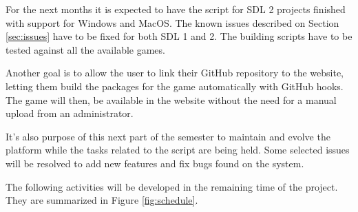 For the next months it is expected to have the script for SDL 2 projects finished with support for Windows and MacOS. The known issues described on Section \ref{sec:issues} have to be fixed for both SDL 1 and 2. The building scripts have to be tested against all the available games.

Another goal is to allow the user to link their GitHub repository to the website, letting them build the packages for the game automatically with GitHub hooks. The game will then, be available in the website without the need for a manual upload from an administrator.

It's also purpose of this next part of the semester to maintain and evolve the platform while the tasks related to the script are being held. Some selected issues will be resolved to add new features and fix bugs found on the system.

The following activities will be developed in the remaining time of the project. They are summarized in Figure \ref{fig:schedule}.

